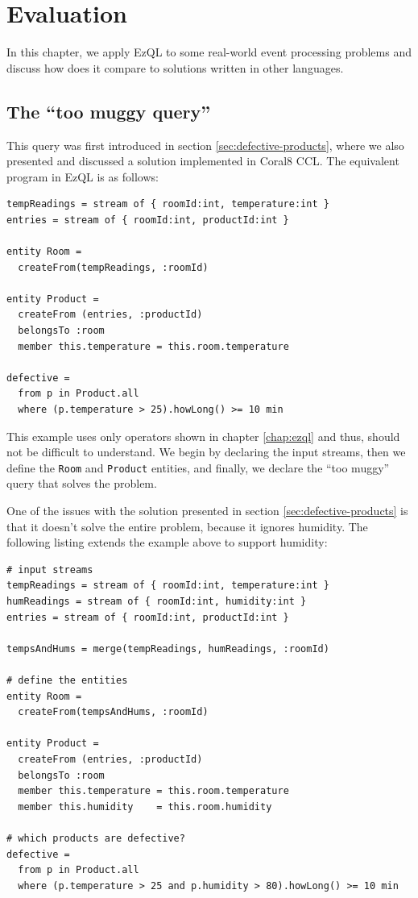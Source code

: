 \chapter{Evaluation}
\label{chap:eval}

In this chapter, we apply EzQL to some real-world event processing
problems and discuss how does it compare to solutions written in other languages.

\section{The ``too muggy query''}

This query was first introduced in section
\ref{sec:defective-products}, where we also presented and discussed a
solution implemented in Coral8 CCL. The equivalent program in EzQL is
as follows:

\begin{lstlisting}
tempReadings = stream of { roomId:int, temperature:int }
entries = stream of { roomId:int, productId:int }

entity Room =
  createFrom(tempReadings, :roomId)

entity Product =
  createFrom (entries, :productId)
  belongsTo :room
  member this.temperature = this.room.temperature

defective =
  from p in Product.all
  where (p.temperature > 25).howLong() >= 10 min
\end{lstlisting}

This example uses only operators shown in chapter \ref{chap:ezql} and
thus, should not be difficult to understand. We begin by declaring the
input streams, then we define the \verb=Room= and \verb=Product=
entities, and finally, we declare the ``too muggy'' query that solves
the problem.

One of the issues with the solution presented in section
\ref{sec:defective-products} is that it doesn't solve the entire
problem, because it ignores humidity. The following listing extends
the example above to support humidity:

\begin{lstlisting}
# input streams
tempReadings = stream of { roomId:int, temperature:int }
humReadings = stream of { roomId:int, humidity:int }
entries = stream of { roomId:int, productId:int }

tempsAndHums = merge(tempReadings, humReadings, :roomId)

# define the entities
entity Room =
  createFrom(tempsAndHums, :roomId)

entity Product =
  createFrom (entries, :productId)
  belongsTo :room
  member this.temperature = this.room.temperature
  member this.humidity    = this.room.humidity

# which products are defective?
defective =
  from p in Product.all
  where (p.temperature > 25 and p.humidity > 80).howLong() >= 10 min
\end{lstlisting}

